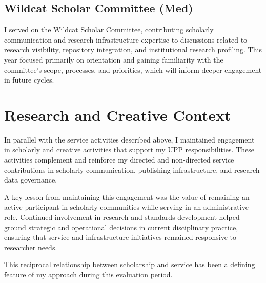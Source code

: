 \vspace{\baselineskip}

\subsection*{Wildcat Scholar Committee (Med)}

I served on the Wildcat Scholar Committee, contributing scholarly communication and research infrastructure expertise to discussions related to research visibility, repository integration, and institutional research profiling. This year focused primarily on orientation and gaining familiarity with the committee’s scope, processes, and priorities, which will inform deeper engagement in future cycles.



\section{Research and Creative Context}

In parallel with the service activities described above, I maintained engagement in scholarly and creative activities that support my UPP responsibilities. These activities complement and reinforce my directed and non-directed service contributions in scholarly communication, publishing infrastructure, and research data governance.

\vspace{\baselineskip}

A key lesson from maintaining this engagement was the value of remaining an active participant in scholarly communities while serving in an administrative role. Continued involvement in research and standards development helped ground strategic and operational decisions in current disciplinary practice, ensuring that service and infrastructure initiatives remained responsive to researcher needs.

\vspace{\baselineskip}

This reciprocal relationship between scholarship and service has been a defining feature of my approach during this evaluation period.
